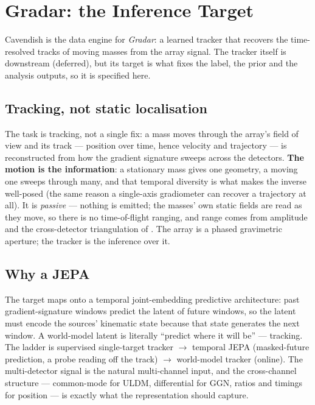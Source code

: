 \documentclass[11pt,a4paper]{article}
\theoremstyle{reqstyle}
\begin{document}
\section{Gradar: the Inference Target}
\label{sec:radar}

Cavendish is the data engine for \emph{Gradar}: a learned tracker that recovers
the time-resolved tracks of moving masses from the array signal. The tracker itself is
downstream (deferred), but its target is what fixes the label, the prior and the analysis
outputs, so it is specified here.

\subsection{Tracking, not static localisation}
The task is tracking, not a single fix: a mass moves through the array's field of view and its
track --- position over time, hence velocity and trajectory --- is reconstructed from how the
gradient signature sweeps across the detectors. \textbf{The motion is the information}: a
stationary mass gives one geometry, a moving one sweeps through many, and that temporal
diversity is what makes the inverse well-posed (the same reason a single-axis gradiometer can
recover a trajectory at all). It is \emph{passive} --- nothing is emitted; the masses' own
static fields are read as they move, so there is no time-of-flight ranging, and range comes
from amplitude and the cross-detector triangulation of . The array is a phased
gravimetric aperture; the tracker is the inference over it.

\subsection{Why a JEPA}
The target maps onto a temporal joint-embedding predictive architecture: past
gradient-signature windows predict the latent of future windows, so the latent must encode the
sources' kinematic state because that state generates the next window. A world-model latent is
literally ``predict where it will be'' --- tracking. The ladder is supervised single-target
tracker $\to$ temporal JEPA (masked-future prediction, a probe reading off the track) $\to$
world-model tracker (online). The multi-detector signal is the natural multi-channel input,
and the cross-channel structure --- common-mode for ULDM, differential for GGN, ratios and
timings for position --- is exactly what the representation should capture.
\end{document}
